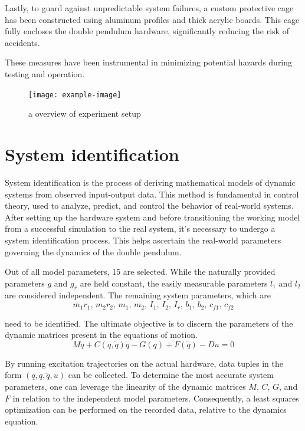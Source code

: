 Lastly, to guard against unpredictable system failures, a custom protective cage has been constructed using aluminum profiles and thick acrylic boards. This cage fully encloses the double pendulum hardware, significantly reducing the risk of accidents.

These measures have been instrumental in minimizing potential hazards during testing and operation.

\begin{figure}[htbp]
    \centering
    \texttt{[image: example-image]}
    \caption{a overview of experiment setup}
    \label{fig:example_figure}
\end{figure}

\section{System identification}
System identification is the process of deriving mathematical models of dynamic systems from observed input-output data. This method is fundamental in control theory, used to analyze, predict, and control the behavior of real-world systems. After setting up the hardware system and before transitioning the working model from a successful simulation to the real system, it's necessary to undergo a system identification process. This helps ascertain the real-world parameters governing the dynamics of the double pendulum.

Out of all model parameters, 15 are selected. While the naturally provided parameters \(g\) and \(g_r\) are held constant, the easily measurable parameters \(l_1\) and \(l_2\) are considered independent. The remaining system parameters, which are 
\[
m_1 r_1,\, m_2 r_2,\, m_1,\, m_2,\, I_1,\, I_2,\, I_r,\, b_1,\, b_2,\, c_{f1},\,c_{f2}
\]

need to be identified. The ultimate objective is to discern the parameters of the dynamic matrices present in the equations of motion.
\begin{equation}
M \ddot{q} + C(q, \dot{q}) \dot{q} - G(q) + F(\dot{q}) - D u = 0
\end{equation}

By running excitation trajectories on the actual hardware, data tuples in the form \((q, \dot{q}, \ddot{q}, u)\) can be collected. To determine the most accurate system parameters, one can leverage the linearity of the dynamic matrices \(M\), \(C\), \(G\), and \(F\) in relation to the independent model parameters. Consequently, a least squares optimization can be performed on the recorded data, relative to the dynamics equation.

